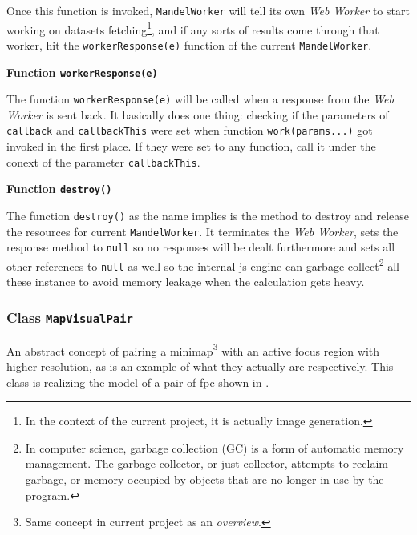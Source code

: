 Once this function is invoked, \texttt{MandelWorker} will tell its own \emph{Web Worker} to start working on datasets fetching\footnote{ In the context of the current project, it is actually image generation. }, and if any sorts of results come through that worker, hit the \texttt{workerResponse(e)} function of the current \texttt{MandelWorker}.

\textbf{Function \texttt{workerResponse(e)}}

The function \texttt{workerResponse(e)} will be called when a response from the \emph{Web Worker} is sent back. It basically does one thing: checking if the parameters of \texttt{callback} and \texttt{callbackThis} were set when function \texttt{work(params...)} got invoked in the first place. If they were set to any function, call it under the conext of the parameter \texttt{callbackThis}.

\textbf{Function \texttt{destroy()}}

The function \texttt{destroy()} as the name implies is the method to destroy and release the resources for current \texttt{MandelWorker}. It terminates the \emph{Web Worker}, sets the response method to \texttt{null} so no responses will be dealt furthermore and sets all other references to \texttt{null} as well so the internal \gls{js} engine can garbage collect\footnote{ In computer science, garbage collection (GC) is a form of automatic memory management. The garbage collector, or just collector, attempts to reclaim garbage, or memory occupied by objects that are no longer in use by the program\cite{wiki:gc}.} all these instance to avoid memory leakage when the calculation gets heavy.

\subsubsection{Class \texttt{MapVisualPair}}

An abstract concept of pairing a minimap\footnote{ Same concept in current project as an \emph{overview}. } with an active focus region with higher resolution, as  is an example of what they actually are respectively. This class is realizing the model of a pair of \gls{fpc} shown in .


